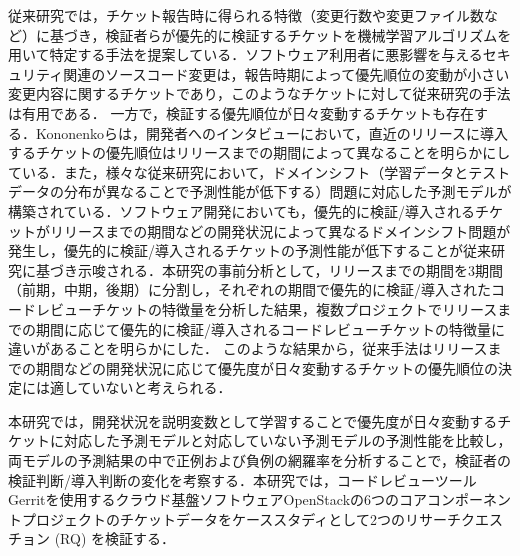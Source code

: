 \documentclass[11pt]{jreport}
\begin{document}
従来研究では，チケット報告時に得られる特徴（変更行数や変更ファイル数など）に基づき，検証者らが優先的に検証するチケットを機械学習アルゴリズムを用いて特定する手法を提案している\cite{prioritizer}\cite{review_prioritize_pineapple}．ソフトウェア利用者に悪影響を与えるセキュリティ関連のソースコード変更は，報告時期によって優先順位の変動が小さい変更内容に関するチケットであり，このようなチケットに対して従来研究の手法は有用である．
一方で，検証する優先順位が日々変動するチケットも存在する．Kononenkoらは，開発者へのインタビューにおいて，直近のリリースに導入するチケットの優先順位はリリースまでの期間によって異なることを明らかにしている\cite{release_merge}．また，様々な従来研究において，ドメインシフト（学習データとテストデータの分布が異なることで予測性能が低下する）問題に対応した予測モデルが構築されている\cite{domain1}\cite{domain2}．ソフトウェア開発においても，優先的に検証/導入されるチケットがリリースまでの期間などの開発状況によって異なるドメインシフト問題が発生し，優先的に検証/導入されるチケットの予測性能が低下することが従来研究\cite{release_merge}に基づき示唆される．本研究の事前分析として，リリースまでの期間を3期間（前期，中期，後期）に分割し，それぞれの期間で優先的に検証/導入されたコードレビューチケットの特徴量を分析した結果，複数プロジェクトでリリースまでの期間に応じて優先的に検証/導入されるコードレビューチケットの特徴量に違いがあることを明らかにした．
このような結果から，従来手法はリリースまでの期間などの開発状況に応じて優先度が日々変動するチケットの優先順位の決定には適していないと考えられる．


本研究では，開発状況を説明変数として学習することで優先度が日々変動するチケットに対応した予測モデルと対応していない予測モデルの予測性能を比較し，両モデルの予測結果の中で正例および負例の網羅率を分析することで，検証者の検証判断/導入判断の変化を考察する．本研究では，コードレビューツールGerritを使用するクラウド基盤ソフトウェアOpenStackの6つのコアコンポーネントプロジェクトのチケットデータをケーススタディとして2つのリサーチクエスチョン (RQ) を検証する．
\end{document}
